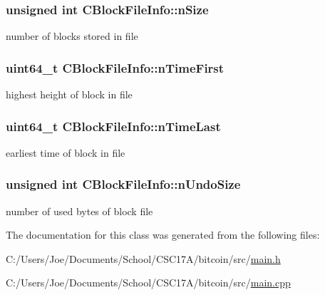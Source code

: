 \subsubsection[{n\+Size}]{\setlength{\rightskip}{0pt plus 5cm}unsigned int C\+Block\+File\+Info\+::n\+Size}\label{class_c_block_file_info_afb13102ba49548c24812a4236851c3a9}


number of blocks stored in file 

\hypertarget{class_c_block_file_info_a0e928257d1f003ede485ce49e8cf9189}{}
\subsubsection[{n\+Time\+First}]{\setlength{\rightskip}{0pt plus 5cm}uint64\+\_\+t C\+Block\+File\+Info\+::n\+Time\+First}\label{class_c_block_file_info_a0e928257d1f003ede485ce49e8cf9189}


highest height of block in file 

\hypertarget{class_c_block_file_info_a1d12e4202474bb2f299d18d7d1f28c78}{}
\subsubsection[{n\+Time\+Last}]{\setlength{\rightskip}{0pt plus 5cm}uint64\+\_\+t C\+Block\+File\+Info\+::n\+Time\+Last}\label{class_c_block_file_info_a1d12e4202474bb2f299d18d7d1f28c78}


earliest time of block in file 

\hypertarget{class_c_block_file_info_ad3e555fd733ef8f38430554c2db5e9d1}{}
\subsubsection[{n\+Undo\+Size}]{\setlength{\rightskip}{0pt plus 5cm}unsigned int C\+Block\+File\+Info\+::n\+Undo\+Size}\label{class_c_block_file_info_ad3e555fd733ef8f38430554c2db5e9d1}


number of used bytes of block file 



The documentation for this class was generated from the following files\+:\begin{DoxyCompactItemize}
\item 
C\+:/\+Users/\+Joe/\+Documents/\+School/\+C\+S\+C17\+A/bitcoin/src/\hyperlink{main_8h}{main.\+h}\item 
C\+:/\+Users/\+Joe/\+Documents/\+School/\+C\+S\+C17\+A/bitcoin/src/\hyperlink{main_8cpp}{main.\+cpp}\end{DoxyCompactItemize}
